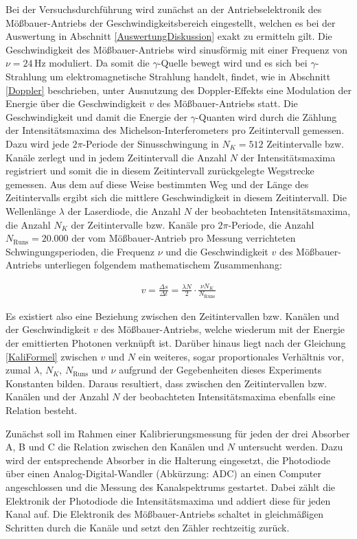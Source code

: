 \documentclass[
a4paper,                %
titlepage=firstiscover, %
captions=tableheading,  %
toc=bibliography,       %
toc=listof,             %
oneside,                %
automark,               %
12pt,                   %
english, ngerman,       %
parskip = half,         %
]{scrartcl}
\begin{document}
Bei der Versuchsdurchführung wird zunächst an der Antriebselektronik des Mößbauer-Antriebs der Geschwindigkeitsbereich eingestellt, welchen es bei der Auswertung in Abschnitt \ref{AuswertungDiskussion} exakt zu ermitteln gilt.
Die Geschwindigkeit des Mößbauer-Antriebs wird sinusförmig mit einer Frequenz von $\nu = 24\,$Hz moduliert.
Da somit die $\gamma$-Quelle bewegt wird und es sich bei $\gamma$-Strahlung um elektromagnetische Strahlung handelt, findet, wie in Abschnitt \ref{Doppler} beschrieben, unter Ausnutzung des Doppler-Effekts eine Modulation der Energie über die Geschwindigkeit $v$ des Mößbauer-Antriebs statt.
Die Geschwindigkeit und damit die Energie der $\gamma$-Quanten wird durch die Zählung der Intensitätsmaxima des Michelson-Interferometers pro Zeitintervall gemessen.
Dazu wird jede $2\pi$-Periode der Sinusschwingung in $N_{K} = 512$ Zeitintervalle bzw. Kanäle zerlegt und in jedem Zeitintervall die Anzahl $N$ der Intensitätsmaxima registriert und somit die in diesem Zeitintervall zurückgelegte Wegstrecke gemessen.
Aus dem auf diese Weise bestimmten Weg und der Länge des Zeitintervalls ergibt sich die mittlere Geschwindigkeit in diesem Zeitintervall.
Die Wellenlänge $\lambda$ der Laserdiode, die Anzahl $N$ der beobachteten Intensitätsmaxima, die Anzahl $N_{K}$ der Zeitintervalle bzw. Kanäle pro $2\pi$-Periode, die Anzahl $N_\text{Runs}=20.000$ der vom Mößbauer-Antrieb pro Messung verrichteten Schwingungsperioden, die Frequenz $\nu$ und die Geschwindigkeit $v$ des Mößbauer-Antriebs unterliegen folgendem mathematischem Zusammenhang:

\begin{align} \label{KaliFormel}
v = \frac{\Delta s}{\Delta t} = \frac{\lambda N}{2}\cdot\frac{\nu N_{K}}{N_\text{Runs}}
\end{align}

\noindent Es existiert also eine Beziehung zwischen den Zeitintervallen bzw. Kanälen und der Geschwindigkeit $v$ des Mößbauer-Antriebs, welche wiederum mit der Energie der emittierten Photonen verknüpft ist.
Darüber hinaus liegt nach der Gleichung \ref{KaliFormel} zwischen $v$ und $N$ ein weiteres, sogar proportionales Verhältnis vor, zumal $\lambda$, $N_{K}$, $N_\text{Runs}$ und $\nu$ aufgrund der Gegebenheiten dieses Experiments Konstanten bilden.
Daraus resultiert, dass zwischen den Zeitintervallen bzw. Kanälen und der Anzahl $N$ der beobachteten Intensitätsmaxima ebenfalls eine Relation besteht.

Zunächst soll im Rahmen einer Kalibrierungsmessung für jeden der drei Absorber A, B und C die Relation zwischen den Kanälen und $N$ untersucht werden.
Dazu wird der entsprechende Absorber in die Halterung eingesetzt, die Photodiode über einen Analog-Digital-Wandler (Abkürzung: ADC) an einen Computer angeschlossen und die Messung des Kanalspektrums gestartet.
Dabei zählt die Elektronik der Photodiode die Intensitätsmaxima und addiert diese für jeden Kanal auf.
Die Elektronik des Mößbauer-Antriebs schaltet in gleichmäßigen Schritten durch die Kanäle und setzt den Zähler rechtzeitig zurück.
\end{document}
